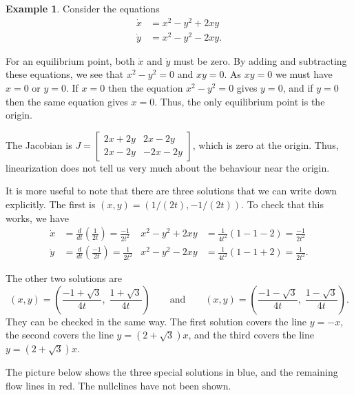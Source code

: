 \documentclass[reqno]{amsart}
\theoremstyle{definition}
\newtheorem{example}[theorem]{Example}
\begin{document}
\newpage

\begin{example}\label{eg-fluid}
 Consider the equations 
 \begin{align*}
  \dot{x} &= x^2-y^2+2xy \\
  \dot{y} &= x^2-y^2-2xy.
 \end{align*}

 For an equilibrium point, both $\dot{x}$ and $\dot{y}$ must be zero.
 By adding and subtracting these equations, we see that $x^2-y^2=0$
 and $xy=0$.  As $xy=0$ we must have $x=0$ or $y=0$.  If $x=0$ then
 the equation $x^2-y^2=0$ gives $y=0$, and if $y=0$ then the same
 equation gives $x=0$.  Thus, the only equilibrium point is the
 origin.  

 The Jacobian is $J=\left[\begin{array}{cc} 2x+2y & 2x-2y \\ 2x-2y & -2x-2y\end{array}\right]$, which
 is zero at the origin.  Thus, linearization does not tell us very
 much about the behaviour near the origin.

 It is more useful to note that there are three solutions that we can
 write down explicitly.  The first is $(x,y)=(1/(2t),-1/(2t))$.  To
 check that this works, we have
 \begin{align*}
  \dot{x} &= \frac{d}{dt}\left(\frac{1}{2t}\right)
           = \frac{-1}{2t^2} &
  x^2-y^2+2xy &= \frac{1}{4t^2}(1-1-2) = \frac{-1}{2t^2} \\
  \dot{y} &= \frac{d}{dt}\left(\frac{-1}{2t}\right)
           = \frac{1}{2t^2} &
  x^2-y^2-2xy &= \frac{1}{4t^2}(1-1+2) = \frac{1}{2t^2}.
 \end{align*}

 The other two solutions are
 \[ (x,y) = \left(\frac{-1+\sqrt{3}}{4t},\;\frac{1+\sqrt{3}}{4t}\right)
    \qquad\text{and}\qquad
    (x,y) = \left(\frac{-1-\sqrt{3}}{4t},\;\frac{1-\sqrt{3}}{4t}\right).
 \]
 They can be checked in the same way.  The first solution covers the
 line $y=-x$, the second covers the line $y=(2+\sqrt{3})x$, and the
 third covers the line $y=(2+\sqrt{3})x$.

 The picture below shows the three special solutions in blue, and the
 remaining flow lines in red.  The nullclines have not been shown.


\end{example}
\end{document}
